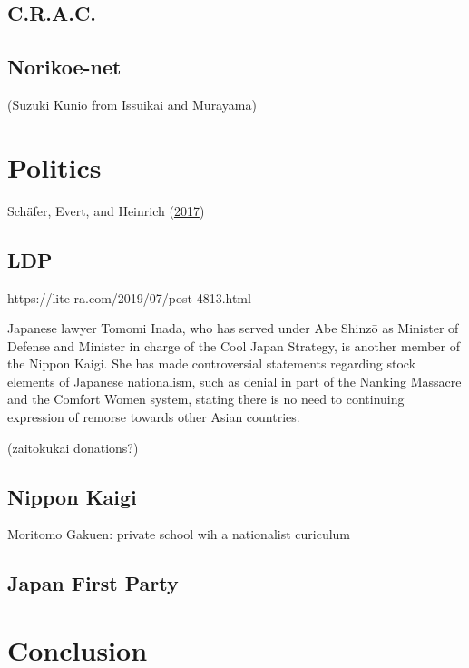 \documentclass[10pt,british,A4paper,,openany]{memoir}
\begin{document}
\subsection{C.R.A.C.}\label{c.r.a.c.}

\subsection{Norikoe-net}\label{norikoe-net}

(Suzuki Kunio from Issuikai and Murayama)

\section{Politics}\label{politics}

Schäfer, Evert, and Heinrich
(\protect\hyperlink{ref-schafer_japans_2017}{2017})

\subsection{LDP}\label{ldp}

https://lite-ra.com/2019/07/post-4813.html

Japanese lawyer Tomomi Inada, who has served under Abe Shinzō as
Minister of Defense and Minister in charge of the Cool Japan Strategy,
is another member of the Nippon Kaigi. She has made controversial
statements regarding stock elements of Japanese nationalism, such as
denial in part of the Nanking Massacre and the Comfort Women system,
stating there is no need to continuing expression of remorse towards
other Asian countries.

(zaitokukai donations?)

\subsection{Nippon Kaigi}\label{nippon-kaigi}

Moritomo Gakuen: private school wih a nationalist curiculum

\subsection{Japan First Party}\label{japan-first-party}

\section{Conclusion}\label{conclusion}
\end{document}
